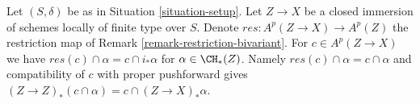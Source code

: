 \begin{remark}
\label{remark-res-push}
Let $(S, \delta)$ be as in Situation \ref{situation-setup}.
Let $Z \to X$ be a closed immersion of schemes locally of
finite type over $S$. Denote $res : A^p(Z \to X) \to A^p(Z)$
the restriction map of Remark \ref{remark-restriction-bivariant}.
For $c \in A^p(Z \to X)$ we have
$res(c) \cap \alpha = c \cap i_*\alpha$ for $\alpha \in \CH_*(Z)$.
Namely $res(c) \cap \alpha = c \cap \alpha$
and compatibility of $c$ with proper pushforward
gives $(Z \to Z)_*(c \cap \alpha) = c \cap (Z \to X)_*\alpha$.
\end{remark}






